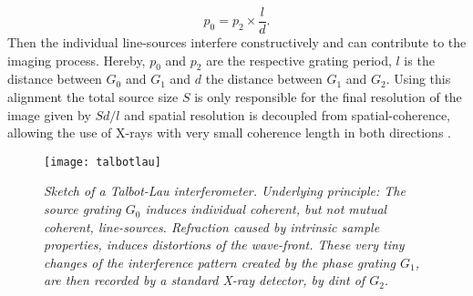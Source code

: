\begin{equation}
p_{0} = p_{2}\times \frac{l}{d}.
\end{equation}
Then the individual line-sources interfere constructively and can contribute to the imaging process. 
Hereby, $p_{0}$ and $p_{2}$ are the respective grating period, $l$ is the distance between $G_{0}$ and $G_{1}$ and $d$ the distance between $G_{1}$ and $G_{2}$. Using this alignment the total source size $S$ is only responsible for the final resolution of the image given by $ Sd/l$ and spatial resolution is decoupled from spatial-coherence, allowing the use of X-rays with very small coherence length in both directions \citep{Pfeiffer2006}. 
\begin{figure}[h]
	\begin{center}
		\texttt{[image: talbotlau]}		
	\end{center}
	\caption[Sketch of a Talbot-Lau interferometer]{\textit{Sketch of a Talbot-Lau interferometer. Underlying principle: The source  grating $G_{0}$ induces individual coherent, but not mutual coherent, line-sources. Refraction caused by intrinsic sample properties, induces distortions of the wave-front. These very tiny changes of the interference pattern created by the phase grating $G_{1}$, are then recorded by a standard X-ray detector, by dint of $G_{2}$.}}
	\label{talbotlau}   		
\end{figure}
